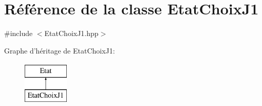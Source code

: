 \hypertarget{class_etat_choix_j1}{\section{Référence de la classe Etat\-Choix\-J1}
\label{class_etat_choix_j1}
}


{\ttfamily \#include $<$Etat\-Choix\-J1.\-hpp$>$}

Graphe d'héritage de Etat\-Choix\-J1\-:\begin{figure}[H]
\begin{center}
\leavevmode
\includegraphics[height=2.000000cm]{class_etat_choix_j1}
\end{center}
\end{figure}
